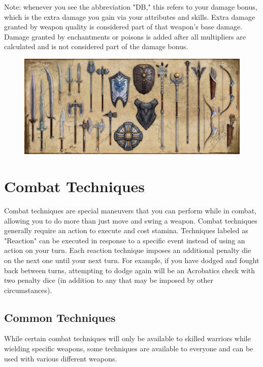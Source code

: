 \documentclass[12pt]{book}
\begin{document}
Note: whenever you see the abbreviation "DB," this refers to your damage bonus, which is the extra damage you gain via your attributes and skills. Extra damage granted by weapon quality is considered part of that weapon's base damage. Damage granted by enchantments or poisons is added after all multipliers are calculated and is not considered part of the damage bonus.

\begin{figure}
	\includegraphics[width=\textwidth]{Equipment.png}
\end{figure}

\section{Combat Techniques}

Combat techniques are special maneuvers that you can perform while in combat, allowing you to do more than just move and swing a weapon. Combat techniques generally require an action to execute and cost stamina. Techniques labeled as "Reaction" can be executed in response to a specific event instead of using an action on your turn. Each reaction technique imposes an additional penalty die on the next one until your next turn. For example, if you have dodged and fought back between turns, attempting to dodge again will be an Acrobatics check with two penalty dice (in addition to any that may be imposed by other circumstances).

\subsection{Common Techniques}

While certain combat techniques will only be available to skilled warriors while wielding specific weapons, some techniques are available to everyone and can be used with various different weapons.
\end{document}
